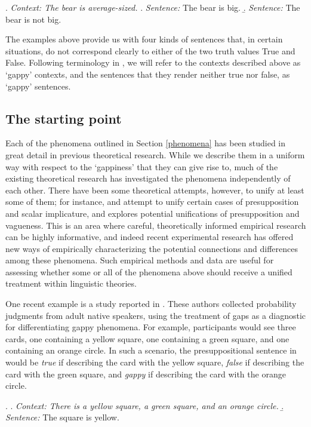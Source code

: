 \documentclass[12pt, letterpaper]{article}
\begin{document}
\ex. \label{vague} \textit{Context: The bear is average-sized.} 
\a. \textit{Sentence:} The bear is big.
\b. \textit{Sentence:} The bear is not big. 

The examples above provide us with four kinds of sentences that, in certain situations, do not correspond clearly to either of the two truth values True and False. Following terminology in \cite*{Cremers:2015a}, we will refer to the contexts described above as `gappy' contexts, and the sentences that they render neither true nor false, as `gappy' sentences.

\subsection{The starting point}

Each of the phenomena outlined in Section \ref{phenomena} has been studied in great detail in previous theoretical research. While we describe them in a uniform way with respect to the `gappiness' that they can give rise to, much of the existing theoretical research has investigated the phenomena independently of each other. There have been some theoretical attempts, however, to unify at least some of them; for instance, \cite{Chemla:2009} and \cite{Romoli:2014} attempt to unify certain cases of presupposition and scalar implicature, and \cite{Zehr:2014} explores potential unifications of presupposition and vagueness. This is an area where careful, theoretically informed empirical research can be highly informative, and indeed recent experimental research has offered new ways of empirically characterizing the potential connections and differences among these phenomena. Such empirical methods and data are useful for assessing whether some or all of the phenomena above should receive a unified treatment within linguistic theories.

One recent example is a study reported in \cite*{Cremers:2015a}. These authors collected probability judgments from adult native speakers, using the treatment of gaps as a diagnostic for differentiating gappy phenomena. For example, participants would see three cards, one containing a yellow square, one containing a green square, and one containing an orange circle. In such a scenario, the presuppositional sentence in \Next[b] would be \textit{true} if describing the card with the yellow square, \textit{false} if describing the card with the green square, and \textit{gappy} if describing the card with the orange circle.

\ex. \a. \textit{Context: There is a yellow square, a green square, and an orange circle.} 
\b. \textit{Sentence:} The square is yellow.
\end{document}
